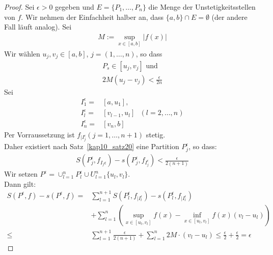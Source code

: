 \begin{proof}
	 Sei $\epsilon > 0$ gegeben und $E = \{P_1, \hdots, P_n\}$
	die Menge der Unstetigkeitsstellen von $f$. Wir nehmen der Einfachheit halber 
	an, dass $\{a,b\} \cap E = \emptyset$ (der andere Fall läuft analog).
	Sei
	\begin{align*}
		 M:= \sup_{x \in [a,b]} \vert f(x) \vert
	\end{align*}
	 Wir wählen $u_j, v_j \in [a,b]$, 
	$j = (1, \hdots, n)$, so dass
	\begin{align*}
		P_s \in [u_j, v_j] \text{ und} \\
		2M (u_j - v_j) < \frac{\epsilon}{2n}
	\end{align*}		
	 Sei 
	 \begin{align*}
		I_1^{\epsilon} = & [a, u_1], \\
		 I_l^{\epsilon} = & [v_{l-1}, u_l] \text{ }  (l = 2, \hdots, n) \\
		 I_n^{\epsilon} = & [v_n, b]
	 \end{align*}
	Per Vorraussetzung ist $f_{\vert I_j^{\epsilon}} (j = 1,\hdots, n+1)$ stetig. \\
	Daher existiert nach Satz~\ref{kap10_satz20}
	eine Partition $P_j^{\epsilon}$, so dass:
	\begin{align*}
		S(P_j^{\epsilon}, f_{I_j{\epsilon}}) - s(P_j^{\epsilon}, f_{I_j^{\epsilon}}) 
		 < \frac{\epsilon}{2(n+1)}
	\end{align*}
	Wir setzen $P^{\epsilon} = \cup_{l = 1}^n P_l^{\epsilon}
	 \cup U_{l=1}^n\{u_l,v_l\}$.\\
	 Dann gilt:
	 \begin{align*}
	 	S(P^{\epsilon},f) - s(P^{\epsilon},f) 
	 	= & \sum_{l=1}^{n+1} S(P_l^{\epsilon},f_{|I_l^{\epsilon}}) - 
	 		s(P_l^{\epsilon},f_{|I_l^{\epsilon}})  \\
	 		& + \sum_{l = 1}^n \left( \sup_{x \in [u_l, v_l]} 
	 		f(x) - \inf_{x \in [u_l, v_l]} f(x) (v_l - u_l)\right) \\
	 		\leq & \sum_{l=1}^{n+1} \frac{\epsilon}{2(n+1)} + \sum_{l=1}^n
	 			2M \cdot(v_l-u_l) \leq \frac{\epsilon}{2} + \frac{\epsilon}{2} 
	 			= \epsilon
	 \end{align*}	 
\end{proof}

